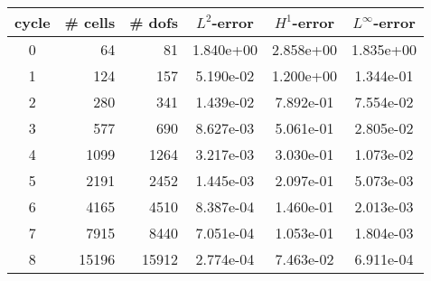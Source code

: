 \documentclass[10pt]{report}
\begin{document}
\begin{table}[H]
\begin{center}
\begin{tabular}{|c|r|r|c|c|c|} \hline
cycle & \# cells & \# dofs & $L^2$-error & $H^1$-error & $L^\infty$-error\\ \hline
0 & 64 & 81 & 1.840e+00 & 2.858e+00 & 1.835e+00\\ \hline
1 & 124 & 157 & 5.190e-02 & 1.200e+00 & 1.344e-01\\ \hline
2 & 280 & 341 & 1.439e-02 & 7.892e-01 & 7.554e-02\\ \hline
3 & 577 & 690 & 8.627e-03 & 5.061e-01 & 2.805e-02\\ \hline
4 & 1099 & 1264 & 3.217e-03 & 3.030e-01 & 1.073e-02\\ \hline
5 & 2191 & 2452 & 1.445e-03 & 2.097e-01 & 5.073e-03\\ \hline
6 & 4165 & 4510 & 8.387e-04 & 1.460e-01 & 2.013e-03\\ \hline
7 & 7915 & 8440 & 7.051e-04 & 1.053e-01 & 1.804e-03\\ \hline
8 & 15196 & 15912 & 2.774e-04 & 7.463e-02 & 6.911e-04\\ \hline
\end{tabular}
\end{center}
\end{table}
\end{document}
